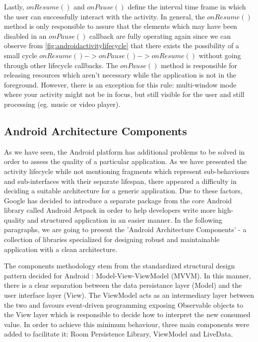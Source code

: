 Lastly, $onResume()$ and $onPause()$ define the interval time frame in which the user can successfully interact with the activity. In general, the $onResume()$ method is only responsible to assure that the elements which may have been disabled in an $onPause()$ callback are fully operating again since we can observe from \ref{fig:androidactivitylifecycle} that there exists the possibility of a small cycle $onResume() -> onPause() -> onResume()$ without going through other lifecycle callbacks. The $onPause()$ method is responsible for releasing resources which aren't necessary while the application is not in the foreground. However, there is an exception for this rule: multi-window mode where your activity might not be in focus, but still visible for the user and still processing (eg. music or video player).

\subsection*{Android Architecture Components}

As we have seen, the Android platform has additional problems to be solved in order to assess the quality of a particular application. As we have presented the activity lifecycle while not mentioning fragments which represent sub-behaviours and sub-interfaces with their separate lifespan, there appeared a difficulty in deciding a suitable architecture for a generic application. Due to these factors, Google has decided to introduce a separate package from the core Android library called Android Jetpack in order to help developers write more high-quality and structured application in an easier manner. In the following paragraphs, we are going to present the 'Android Architecture Components' - a collection of libraries specialized for designing robust and maintainable application with a clean architecture.

The components methodology stem from the standardized structural design pattern decided for Android : Model-View-ViewModel (MVVM). In this manner, there is a clear separation between the data persistance layer (Model) and the user interface layer (View). The ViewModel acts as an intermediary layer between the two and favours event-driven programming exposing Observable objects to the View layer which is responsible to decide how to interpret the new consumed value. In order to achieve this minimum behaviour, three main components were added to facilitate it: Room Persistence Library, ViewModel and LiveData.

